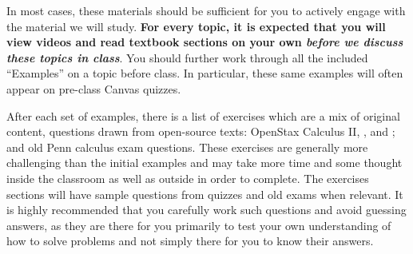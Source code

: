 \documentclass{ximera}
\begin{document}
 In most cases, these materials should be sufficient for you to actively engage with the material we will study. \textbf{For every topic, it is expected that you will view videos and read textbook sections on your own \textit{before we discuss these topics in class}}. You should further work through all the included ``Examples'' on a topic before class. In particular, these same examples will often appear on pre-class Canvas quizzes.
 
After each set of examples, there is a list of exercises which are a mix of original content, questions drawn from open-source texts: OpenStax Calculus II, , and ; and old Penn calculus exam questions.  These exercises are generally more challenging than the initial examples and may take more time and some thought inside the classroom as well as outside in order to complete. The exercises sections will have sample questions from quizzes and old exams when relevant. It is highly recommended that you carefully work such questions and avoid guessing answers, as they are there for you primarily to test your own understanding of how to solve problems and not simply there for you to know their answers.

 
\end{document}
